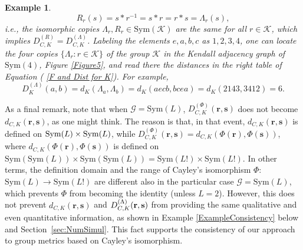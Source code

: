 \documentclass{article}
\newtheorem{example}[theorem]{Example}
\begin{document}
\begin{example}
\begin{equation*}
R_{r}(s)=s\ast r^{-1}=s\ast r=r\ast s=\Lambda _{r}(s),
\end{equation*}%
i.e., the isomorphic copies $\Lambda _{r},R_{r}\in \mathrm{Sym}(\mathcal{K})$
are the same for all $r\in \mathcal{K}$, which implies $%
D_{C,K}^{(R)}=D_{C,K}^{(\Lambda )}$. Labeling the elements $e,a,b,c$ as $%
1,2,3,4$, one can locate the four copies $\{\Lambda _{r}:r\in \mathcal{K}\}$
of the group $\mathcal{K}$ in the Kendall adjacency graph of $\mathrm{Sym}(4)$,
Figure \ref{Figure5}, and read there the distances in the right table of Equation (%
\ref{F and Dist for K}). For example,%
\begin{equation*}
D_{K}^{(\Lambda )}(a,b)=d_{K}(\Lambda _{a},\Lambda
_{b})=d_{K}(aecb,bcea)=d_{K}(2143,3412)=6.
\end{equation*}
\end{example}

As a final remark, note that when $\mathcal{G}=\mathrm{Sym}(L)$, $%
D_{C,K}^{(\Phi )}(\mathbf{r},\mathbf{s})$ does not become $d_{C,K}(\mathbf{r}%
,\mathbf{s})$, as one might think. The reason is that, in that event, $%
d_{C,K}(\mathbf{r},\mathbf{s})$ is defined on $\mathrm{Sym}(L)\times \mathrm{%
Sym}(L)$, while $D_{C,K}^{(\Phi )}(\mathbf{r},\mathbf{s})=d_{C,K}(\Phi (%
\mathbf{r}),\Phi (\mathbf{s}))$, where $d_{C,K}(\Phi (\mathbf{r}),\Phi (%
\mathbf{s}))$ is defined on $\mathrm{Sym}(\mathrm{Sym}(L))\times \mathrm{Sym}%
(\mathrm{Sym}(L))=\mathrm{Sym}(L!)\times \mathrm{Sym}(L!)$. In other terms,
the definition domain and the range of Cayley's isomorphism $\Phi :$ $%
\mathrm{Sym}(L)\rightarrow \mathrm{Sym}(L!)$ are different also in the
particular case $\mathcal{G}=\mathrm{Sym}(L)$, which prevents $\Phi $ from
becoming the identity (unless $L=2$). However, this does not prevent $%
d_{C,K}(\mathbf{r},\mathbf{s})$ and $D_{C,K}^{(\Lambda )}(\mathbf{r},\mathbf{%
s})$ from providing the same qualitative and even quantitative information, as shown in Example %
\ref{ExampleConsistency} below and Section~\ref{sec:NumSimul}. This fact
supports the consistency of our approach to group metrics based on Cayley's
isomorphism.
\end{document}
